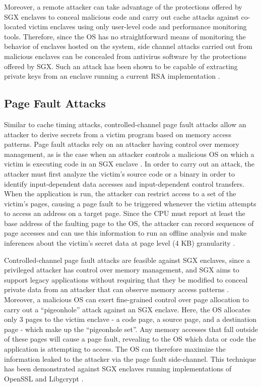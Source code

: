 Moreover, a remote attacker can take advantage of the protections offered by SGX enclaves to conceal malicious code and carry out cache attacks against co-located victim enclaves using only user-level code and performance monitoring tools. Therefore, since the OS has no straightforward means of monitoring the behavior of enclaves hosted on the system, side channel attacks carried out from malicious enclaves can be concealed from antivirus software by the protections offered by SGX. Such an attack has been shown to be capable of extracting private keys from an enclave running a current RSA implementation \cite{schwarz_malware_2017}.

\subsection{Page Fault Attacks}

Similar to cache timing attacks, controlled-channel page fault attacks allow an attacker to derive secrets from a victim program based on memory access patterns. Page fault attacks rely on an attacker having control over memory management, as is the case when an attacker controls a malicious OS on which a victim is executing code in an SGX enclave \cite{intel_corporation_tutorial_2015}. In order to carry out an attack, the attacker must first analyze the victim's source code or a binary in order to identify input-dependent data accesses and input-dependent control transfers. When the application is run, the attacker can restrict access to a set of the victim's pages, causing a page fault to be triggered whenever the victim attempts to access an address on a target page. Since the CPU must report at least the base address of the faulting page to the OS, the attacker can record sequences of page accesses and can use this information to run an offline analysis and make inferences about the victim's secret data at page level (4 KB) granularity \cite{xu_controlled-channel_2015, shinde_preventing_2015}.

Controlled-channel page fault attacks are feasible against SGX enclaves, since a privileged attacker has control over memory management, and SGX aims to support legacy applications without requiring that they be modified to conceal private data from an attacker that can observe memory access patterns \cite{xu_controlled-channel_2015}. Moreover, a malicious OS can exert fine-grained control over page allocation to carry out a ``pigeonhole'' attack against an SGX enclave. Here, the OS allocates only 3 pages to the victim enclave - a code page, a source page, and a destination page - which make up the ``pigeonhole set''. Any memory accesses that fall outside of these pages will cause a page fault, revealing to the OS which data or code the application is attempting to access. The OS can therefore maximize the information leaked to the attacker via the page fault side-channel. This technique has been demonstrated against SGX enclaves running implementations of OpenSSL and Libgcrypt \cite{shinde_preventing_2015}.

